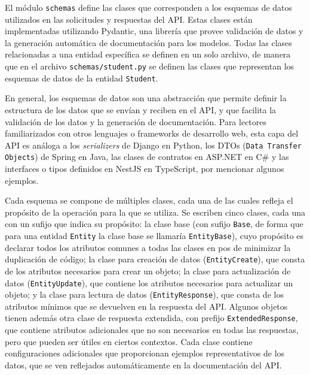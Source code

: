 El módulo \texttt{schemas} define las clases que corresponden a los esquemas de datos utilizados en las solicitudes y respuestas del \gls{API}. Estas clases están implementadas utilizando \gls{Pydantic}, una librería que provee validación de datos y la generación automática de documentación para los modelos. Todas las clases relacionadas a una entidad específica se definen en un solo archivo, de manera que en el archivo \texttt{schemas/student.py} se definen las clases que representan los esquemas de datos de la entidad \texttt{Student}.

En general, los esquemas de datos son una abstracción que permite definir la estructura de los datos que se envían y reciben en el \gls{API}, y que facilita la validación de los datos y la generación de documentación. Para lectores familiarizados con otros lenguajes o frameworks de desarrollo web, esta capa del \gls{API} es análoga a los \textit{serializers} de Django en \gls{Python}, los DTOs (\texttt{Data Transfer Objects}) de Spring en Java, las clases de contratos en ASP.NET en C\# y las interfaces o tipos definidos en NestJS en TypeScript, por mencionar algunos ejemplos.

Cada esquema se compone de múltiples clases, cada una de las cuales refleja el propósito de la operación para la que se utiliza. Se escriben cinco clases, cada una con un sufijo que indica su propósito: la clase base (con sufijo \texttt{Base}, de forma que para una entidad \texttt{Entity} la clase base se llamaría \texttt{EntityBase}), cuyo propósito es declarar todos los atributos comunes a todas las clases en pos de minimizar la duplicación de código; la clase para creación de datos (\texttt{EntityCreate}), que consta de los atributos necesarios para crear un objeto; la clase para actualización de datos (\texttt{EntityUpdate}), que contiene los atributos necesarios para actualizar un objeto; y la clase para lectura de datos (\texttt{EntityResponse}), que consta de los atributos mínimos que se devuelven en la respuesta del \gls{API}. Algunos objetos tienen además otra clase de respuesta extendida, con prefijo \texttt{ExtendedResponse}, que contiene atributos adicionales que no son necesarios en todas las respuestas, pero que pueden ser útiles en ciertos contextos. Cada clase contiene configuraciones adicionales que proporcionan ejemplos representativos de los datos, que se ven reflejados automáticamente en la documentación del \gls{API}.

